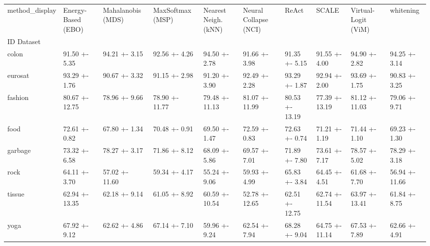 \begin{tabular}{llllllllll}
\toprule
method_display & Energy-Based (EBO) & Mahalanobis (MDS) & MaxSoftmax (MSP) & Nearest Neigh. (kNN) & Neural Collapse (NCI) & ReAct & SCALE & Virtual-Logit (ViM) & whitening \\
ID Dataset &  &  &  &  &  &  &  &  &  \\
\midrule
colon & 91.50 +- 5.35 & 94.21 +- 3.15 & 92.56 +- 4.26 & 94.50 +- 2.78 & 91.66 +- 3.98 & 91.35 +- 5.15 & 91.55 +- 4.00 & 94.90 +- 2.82 & 94.25 +- 3.14 \\
eurosat & 93.29 +- 1.76 & 90.67 +- 3.32 & 91.15 +- 2.98 & 91.20 +- 3.90 & 92.49 +- 2.28 & 93.29 +- 1.87 & 92.94 +- 2.00 & 93.69 +- 1.75 & 90.83 +- 3.25 \\
fashion & 80.67 +- 12.75 & 78.96 +- 9.66 & 78.90 +- 11.77 & 79.48 +- 11.13 & 81.07 +- 11.99 & 80.53 +- 13.19 & 77.39 +- 13.19 & 81.12 +- 11.03 & 79.06 +- 9.71 \\
food & 72.61 +- 0.82 & 67.80 +- 1.34 & 70.48 +- 0.91 & 69.50 +- 1.47 & 72.59 +- 0.83 & 72.63 +- 0.74 & 71.21 +- 1.19 & 71.44 +- 1.10 & 69.23 +- 1.30 \\
garbage & 73.32 +- 6.58 & 78.27 +- 3.17 & 71.86 +- 8.12 & 68.09 +- 5.86 & 69.57 +- 7.01 & 71.89 +- 7.80 & 73.61 +- 7.17 & 78.57 +- 5.02 & 78.29 +- 3.18 \\
rock & 64.11 +- 3.70 & 57.02 +- 11.60 & 59.34 +- 4.17 & 55.24 +- 9.06 & 59.93 +- 4.99 & 65.83 +- 3.84 & 64.45 +- 4.51 & 61.68 +- 7.70 & 56.94 +- 11.66 \\
tissue & 62.94 +- 13.35 & 62.18 +- 9.14 & 61.05 +- 8.92 & 60.59 +- 10.54 & 52.78 +- 12.65 & 62.51 +- 12.75 & 62.74 +- 11.54 & 63.97 +- 13.41 & 61.84 +- 8.75 \\
yoga & 67.92 +- 9.12 & 62.62 +- 4.86 & 67.14 +- 7.10 & 59.96 +- 9.24 & 62.54 +- 7.94 & 68.28 +- 9.04 & 64.75 +- 11.14 & 67.53 +- 7.89 & 62.66 +- 4.91 \\
\bottomrule
\end{tabular}
